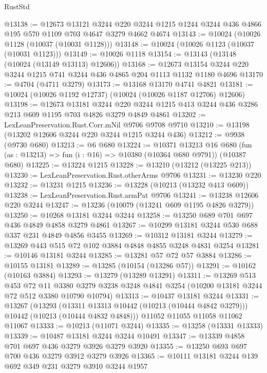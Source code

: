 \begin{lexlean}{RustStd}
\begin{coremodule}
@13138 := @12673
    @13121
    @3244
    @220
    @3244
    @1215
    @1244
    @3244
    @436
    @4866
    @195
    @570
    @1109
    @703
    @4647
    @3279
    @4662
    @4674
@13143 := @10024 (@10026 @1128 (@10037 (@10031 @1128)))
@13148 := @10024 (@10026 @1123 (@10037 (@10031 @1123)))
@13149 := @10026 @1118
@13154 := @13143 (@13148 (@10024 (@13149 @13113) @12606))
@13168 := @12673 @13154 @3244 @220 @3244 @1215 @741 @3244 @436 @4865 @204 @1113 @1132 @1180 @4696
@13170 := @4704 (@4711 @3279)
@13173 := @13168 @13170 @4741 @4821
@13181 := @10024 (@10026 @1192 @12737) (@10024 (@10026 @1187 @12706) @12606)
@13198 := @12673
    @13181
    @3244
    @220
    @3244
    @1215
    @413
    @3244
    @436
    @3286
    @213
    @609
    @1195
    @703
    @4826
    @3279
    @4849
    @4861
@13202 := LexLeanPreservation.Rust.Corr.mNil @9706 @9708 @9710
@13210 := @13198 (@13202 @12606 @3244 @220 @3244 @1215 @3244 @436)
@13212 := @9938 (@9730 @680)
@13213 := @6 @680
@13224 := @10371
    @13213
    @16
    @680
    (fun (as : @13213) => fun (i : @16) => @10380 (@10364 @680 @9791))
    (@10387 @680)
@13225 := @13224 @1215
@13228 := @13210 (@13212 (@13225 @213))
@13230 := LexLeanPreservation.Rust.otherArms @9706
@13231 := @13230 @220
@13232 := @13231 @1215
@13236 := @13228 (@10213 (@13232 @413 @609))
@13238 := LexLeanPreservation.Rust.armPat @9706
@13241 := @13238 @12606 @220 @3244
@13247 := @13236 (@10079 (@13241 @609 @1195 @4826 @3279))
@13250 := @10268 @13181 @3244 @3244
@13258 := @13250 @689 @701 @697 @436 @4849 @4858 @3279 @4861
@13267 := @10299 @13181 @3244 @530 @688 @337 @231 @4849 @4856 @3455
@13269 := @10312 @13181 @3244
@13279 := @13269 @443 @515 @72 @102 @3884 @4848 @4855 @3248 @4831 @3254
@13281 := @10146 @13181 @3244
@13285 := @13281 @57 @72 @57 @3884
@13286 := @10155 @13181
@13289 := @13285 (@10154 (@13286 @57))
@13291 := @10162 (@10163 @3884)
@13293 := @13279 (@13289 @13291)
@13311 := @13269
    @513
    @453
    @72
    @11
    @3380
    @3279
    @3238
    @3248
    @4841
    @3254
    (@10200 @13181 @3244 @72 @512 @3380 @10790 @10794)
@13313 := @10437 @13181 @3244
@13331 := @13267
    (@13293
      (@13311 @13313 @10442 (@10213 (@10444 @4842 @3279)))
      @10442
      (@10213 (@10444 @4832 @4848)))
    @11052
    @11055
    @11058
    @11062
    @11067
@13333 := @10213 (@11071 @3244)
@13335 := @13258 (@13331 @13333)
@13339 := @10487 @13181 @3244 @3244 @10491
@13347 := @13339 @4858 @701 @697 @436 @3279 @3926 @3279 @3920
@13355 := @13250 @693 @697 @700 @436 @3279 @3912 @3279 @3926
@13365 := @10111 @13181 @3244 @139 @692 @349 @231 @3279 @3910 @3244 @1957

\end{coremodule}
\end{lexlean}
